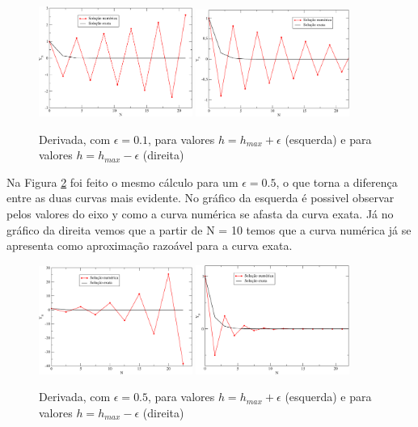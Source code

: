 \documentclass[a4wide]{report}
\begin{document}
\begin{figure}[!htb]
\centering
\includegraphics[width=0.447\textwidth]{1-1.pdf}
\includegraphics[width=0.447\textwidth]{1-2.pdf}
\caption{ Derivada, com $\epsilon = 0.1$, para valores $ h = h_{max} + \epsilon $ (esquerda) e para valores $ h = h_{max} - \epsilon $ (direita)  }
\label{tau}
\end{figure}

Na Figura \ref{tau2} foi feito o mesmo cálculo para um $\epsilon = 0.5$, o que torna a diferença entre as duas curvas mais evidente. No gráfico da esquerda é possivel observar pelos valores do eixo y como a curva numérica se afasta da curva exata. Já no gráfico da direita vemos que a partir de N = 10 temos que a curva numérica já se apresenta como aproximação razoável para a curva exata.


\begin{figure}[!htb]
\centering
\includegraphics[width=0.447\textwidth]{2-1.pdf}
\includegraphics[width=0.447\textwidth]{2-2.pdf}
\caption{ Derivada, com $\epsilon = 0.5$, para valores $ h = h_{max} + \epsilon $ (esquerda) e para valores $ h = h_{max} - \epsilon $ (direita)  }
\label{tau2}
\end{figure}
\end{document}
